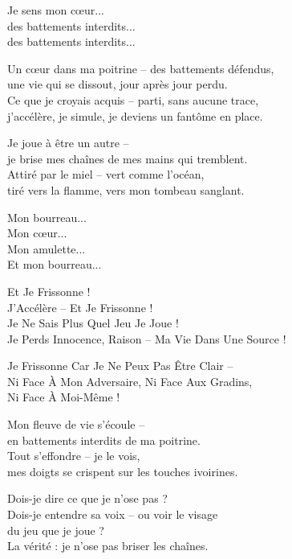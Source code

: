\begin{lyrics}

Je sens mon cœur...\\
des battements interdits...\\
des battements interdits...


Un cœur dans ma poitrine – des battements défendus,\\
une vie qui se dissout, jour après jour perdu.\\
Ce que je croyais acquis – parti, sans aucune trace,\\
j'accélère, je simule, je deviens un fantôme en place.

Je joue à être un autre –\\
je brise mes chaînes de mes mains qui tremblent.\\
Attiré par le miel – vert comme l'océan,\\
tiré vers la flamme, vers mon tombeau sanglant.


Mon bourreau...\\
Mon cœur...\\
Mon amulette...\\
Et mon bourreau...


Et Je Frissonne !\\
J'Accélère – Et Je Frissonne !\\
Je Ne Sais Plus Quel Jeu Je Joue !\\
Je Perds Innocence, Raison – Ma Vie Dans Une Source !

Je Frissonne Car Je Ne Peux Pas Être Clair –\\
Ni Face À Mon Adversaire, Ni Face Aux Gradins,\\
Ni Face À Moi-Même !


Mon fleuve de vie s'écoule –\\
en battements interdits de ma poitrine.\\
Tout s'effondre – je le vois,\\
mes doigts se crispent sur les touches ivoirines.

Dois-je dire ce que je n'ose pas ?\\
Dois-je entendre sa voix – ou voir le visage\\
du jeu que je joue ?\\
La vérité : je n'ose pas briser les chaînes.


\end{lyrics}
